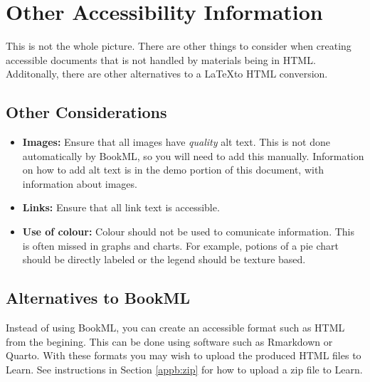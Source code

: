 \section{Other Accessibility Information}
\label{sec:otheraccessibility}

This is not the whole picture. There are other things to consider when creating accessible documents that is not handled by materials being in HTML. Additonally, there are other alternatives to a \LaTeX to HTML conversion. 

\subsection{Other Considerations}
\label{ssec:otheraccessibility}

\begin{itemize}
    \item \textbf{Images:} Ensure that all images have \textit{quality} alt text. This is not done automatically by BookML, so you will need to add this manually. Information on how to add alt text is in the demo portion of this document, with information about images.
    \item \textbf{Links:} Ensure that all link text is accessible.
    \item \textbf{Use of colour:} Colour should not be used to comunicate information. This is often missed in graphs and charts. For example, potions of a pie chart should be directly labeled or the legend should be texture based.
\end{itemize}

\subsection{Alternatives to BookML}
Instead of using BookML, you can create an accessible format such as HTML from the begining.
This can be done using software such as Rmarkdown or Quarto. With these formats you may wish to upload the produced HTML files to Learn. See instructions in Section \ref{appb:zip} for how to upload a zip file to Learn.

